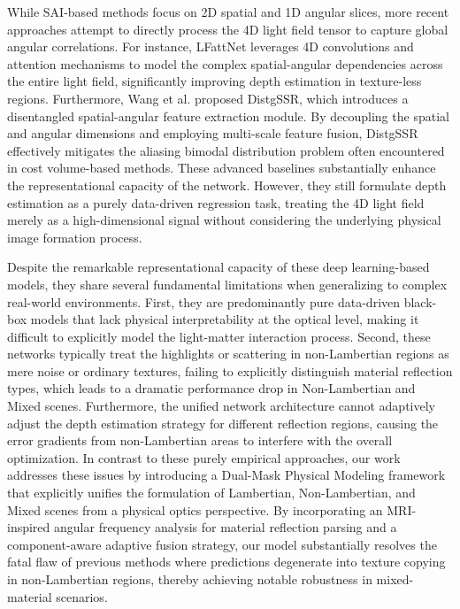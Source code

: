 \documentclass[lettersize,journal]{IEEEtran}
\begin{document}
While SAI-based methods focus on 2D spatial and 1D angular slices, more recent approaches attempt to directly process the 4D light field tensor to capture global angular correlations. For instance, LFattNet \cite{LFattNet4Dconvolutionattent} leverages 4D convolutions and attention mechanisms to model the complex spatial-angular dependencies across the entire light field, significantly improving depth estimation in texture-less regions. Furthermore, Wang et al. \cite{DistgSSRdisentangledfeatures} proposed DistgSSR, which introduces a disentangled spatial-angular feature extraction module. By decoupling the spatial and angular dimensions and employing multi-scale feature fusion, DistgSSR effectively mitigates the aliasing bimodal distribution problem often encountered in cost volume-based methods. These advanced baselines substantially enhance the representational capacity of the network. However, they still formulate depth estimation as a purely data-driven regression task, treating the 4D light field merely as a high-dimensional signal without considering the underlying physical image formation process.

Despite the remarkable representational capacity of these deep learning-based models, they share several fundamental limitations when generalizing to complex real-world environments. First, they are predominantly pure data-driven black-box models that lack physical interpretability at the optical level, making it difficult to explicitly model the light-matter interaction process. Second, these networks typically treat the highlights or scattering in non-Lambertian regions as mere noise or ordinary textures, failing to explicitly distinguish material reflection types, which leads to a dramatic performance drop in Non-Lambertian and Mixed scenes. Furthermore, the unified network architecture cannot adaptively adjust the depth estimation strategy for different reflection regions, causing the error gradients from non-Lambertian areas to interfere with the overall optimization. In contrast to these purely empirical approaches, our work addresses these issues by introducing a Dual-Mask Physical Modeling framework that explicitly unifies the formulation of Lambertian, Non-Lambertian, and Mixed scenes from a physical optics perspective. By incorporating an MRI-inspired angular frequency analysis for material reflection parsing and a component-aware adaptive fusion strategy, our model substantially resolves the fatal flaw of previous methods where predictions degenerate into texture copying in non-Lambertian regions, thereby achieving notable robustness in mixed-material scenarios.
\end{document}
